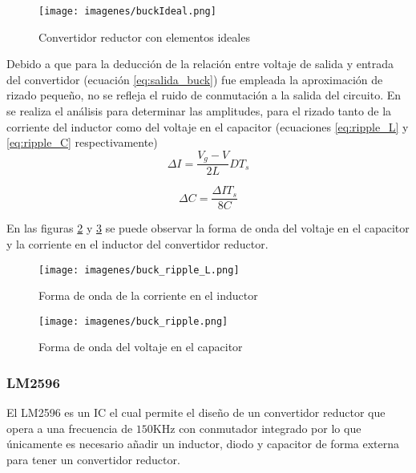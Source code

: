 \begin{figure}[H]
    \centering
    \texttt{[image: imagenes/buckIdeal.png]}
    \caption{Convertidor reductor con elementos ideales \cite{erickson_fundamentals_2020}}
    \label{fig:buck}
\end{figure}

Debido a que para la deducción de la relación entre voltaje de salida y 
entrada del convertidor (ecuación \ref{eq:salida_buck}) fue empleada la
aproximación de rizado pequeño, no se refleja el ruido de conmutación 
a la salida del circuito. En \cite{erickson_fundamentals_2020} se 
realiza el análisis para determinar las amplitudes, para el rizado tanto de 
la corriente del inductor como del voltaje en el capacitor (ecuaciones 
\ref{eq:ripple_L} y \ref{eq:ripple_C} respectivamente)
\begin{equation}
    \Delta I = \frac{V_g-V}{2L}DT_s
    \label{eq:ripple_L}
\end{equation}

\begin{equation}
    \Delta C = \frac{\Delta I T_s}{8C}
    \label{eq:ripple_C}
\end{equation}

En las figuras \ref{fig:ripple_L} y \ref{fig:ripple_C} se puede observar la forma de onda del voltaje
en el capacitor y la corriente en el inductor del convertidor reductor.

\begin{figure}[H]
    \centering
    \texttt{[image: imagenes/buck\_ripple\_L.png]}
    \caption{Forma de onda de la corriente en el inductor \cite{erickson_fundamentals_2020}}
    \label{fig:ripple_L}
\end{figure}

\begin{figure} [H]
    \centering
    \texttt{[image: imagenes/buck\_ripple.png]}
    \caption{Forma de onda del voltaje en el capacitor \cite{erickson_fundamentals_2020}}
    \label{fig:ripple_C}
\end{figure}

\subsubsection{LM2596}

 El LM2596 es un IC el cual permite el diseño de un convertidor reductor que opera a una 
 frecuencia de $150\text{KHz}$ con conmutador integrado
por lo que únicamente es necesario añadir un inductor, diodo y capacitor de 
 forma externa para tener un convertidor reductor. 
 
